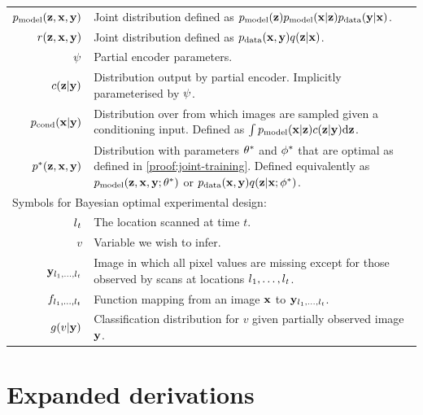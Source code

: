 \begin{table}
\begin{tabular}{rp{11cm}}
    $p_{\rm{model}}{}(\mathbf{z}{}, \mathbf{x}{}, \mathbf{y}{})$        & Joint distribution defined as $p_{\rm{model}}{}(\mathbf{z}{})p_{\rm{model}}{}(\mathbf{x}{}|\mathbf{z}{})p_{\rm{data}}{}(\mathbf{y}{}|\mathbf{x}{})$. \\
    $r(\mathbf{z}{},\mathbf{x}{}, \mathbf{y}{})$                 & Joint distribution defined as $p_{\rm{data}}{}(\mathbf{x}{}, \mathbf{y}{})q(\mathbf{z}{}|\mathbf{x}{})$. \\
    $\psi$                            & Partial encoder parameters. \\
    $c{}(\mathbf{z}{}|\mathbf{y}{})$                 & Distribution output by partial encoder. Implicitly parameterised by $\psi$. \\
    $p_{\text{cond}}{}(\mathbf{x}{}|\mathbf{y}{})$             & Distribution over from which images are sampled given a conditioning input. Defined as $\int p_{\rm{model}}{}(\mathbf{x}{}|\mathbf{z}{})c{}(\mathbf{z}{}|\mathbf{y}{}) \mathrm{d}\mathbf{z}{}$. \\
    ${p}^*{}(\mathbf{z}{}, \mathbf{x}{}, \mathbf{y}{})$           & Distribution with parameters ${\theta}^*$ and ${\phi}^*$ that are optimal as defined in \cref{proof:joint-training}. Defined equivalently as $p_{\rm{model}}{}(\mathbf{z}{}, \mathbf{x}{}, \mathbf{y}{}; {\theta}^*)$ or $p_{\rm{data}}{}(\mathbf{x}{}, \mathbf{y}{}) q(\mathbf{z}{}|\mathbf{x}{}; {\phi}^*)$.  \\
    \midrule
    \multicolumn{2}{l}{Symbols for Bayesian optimal experimental design:} \\
    $l{}_t$                                 & The location scanned at time $t$. \\
    $v$                                   & Variable we wish to infer. \\
    $\mathbf{y}{}_{l{}_1,\ldots,l{}_t}$             & Image in which all pixel values are missing except for those observed by scans at locations $l{}_1,\ldots,l{}_t$. \\
    $f_{l{}_1,\ldots,l{}_t}$                    & Function mapping from an image $\mathbf{x}{}$ to $\mathbf{y}{}_{l{}_1,\ldots,l{}_t}$. \\
    $g(v|\mathbf{y}{})$                       & Classification distribution for $v$ given partially observed image $\mathbf{y}{}$. \\
    \bottomrule
  \end{tabular}
  \vspace{-1em}
\end{table}


\section{Expanded derivations}

